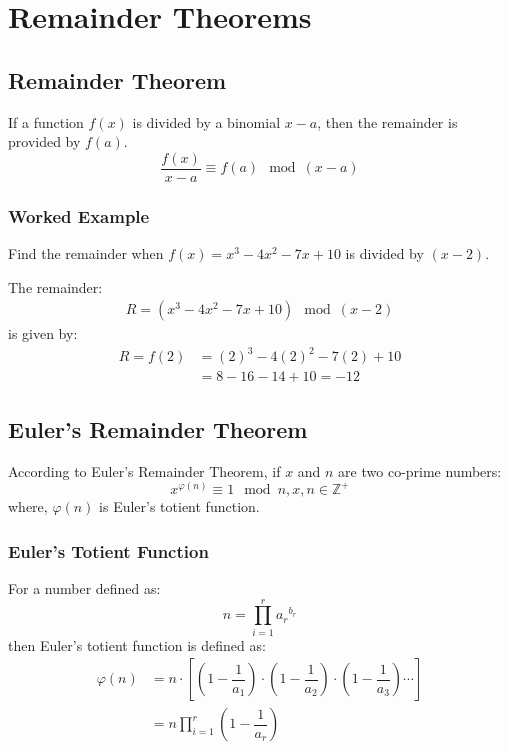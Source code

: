 \chapter{Remainder Theorems}


\section{Remainder Theorem}
If a function $f(x)$ is divided by a binomial $x-a$, then the remainder is provided by $f(a)$.
\begin{equation}
	\dfrac{f(x)}{x-a} \equiv f(a) \mod \left(x-a\right)
\end{equation}

\subsection*{Worked Example}
Find the remainder when $f(x) = x^3 - 4 x^2 - 7 x + 10$ is divided by $(x-2)$.\par
The remainder:
\begin{align*}
	R = \left(x^3 - 4 x^2 - 7 x + 10\right)\mod\left(x-2\right)
\end{align*}
is given by:
\begin{align*}
	R = f(2) & = (2)^3 - 4 (2)^2 - 7(2) + 10\\ & = 8 - 16 - 14 + 10 = -12
\end{align*}


\section{Euler's Remainder Theorem}
According to Euler's Remainder Theorem, if $x$ and $n$ are two co-prime numbers:
\begin{equation}
	x^{\varphi (n)} \equiv 1 \mod n, x,n \in \mathbb{Z}^+
\end{equation}
where, $\varphi(n)$ is Euler's totient function.

\subsection{Euler's Totient Function}
For a number defined as:
\begin{equation}
	n=\prod_{i=1}^r {a_r}^{b_r}
\end{equation}
then Euler's totient function is defined as:
\begin{align}
	\varphi(n) & = n \cdot \left[\left( 1 - \dfrac{1}{a_1} \right) \cdot \left( 1 - \dfrac{1}{a_2} \right) \cdot \left( 1 - \dfrac{1}{a_3} \right) \cdots \right] \nonumber \\
	& = n \prod_{i=1}^r \left(1 - \dfrac{1}{a_r} \right)
\end{align}


